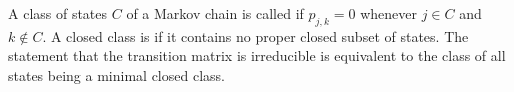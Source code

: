 A class of states $C$ of a Markov chain is called  if $p_{j,k} = 0$ whenever $j \in C$ and $k \notin C$. A closed class is  if it contains no proper closed subset of states. The statement that the transition matrix is irreducible is equivalent to the class of all states being a minimal closed class.
